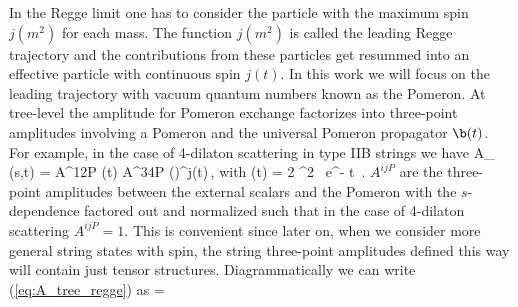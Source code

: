 In the Regge limit one has to consider the particle with the maximum spin $j(m^2)$ for each mass. The function $j(m^2)$ is called the leading Regge trajectory and the contributions from these particles get resummed into an effective particle with continuous spin $j(t)$.
In this work we will focus on the leading trajectory with   vacuum  quantum numbers known as the Pomeron.
At tree-level the amplitude for Pomeron exchange factorizes into three-point amplitudes involving a Pomeron and the universal Pomeron propagator $\b(t)$. For example,  in the case of 4-dilaton scattering in type IIB strings we have
\beq
A_ (s,t)  =    A^{12P} \beta(t) A^{34P} \left(\right)^{j(t)}\,,
\label{eq:A_tree_regge}
\eeq
with
\beq
\beta(t) =   2 \pi^2 \,
e^{-  t} \,.
\label{eq:pomeron_propagator}
\eeq
$A^{ijP}$ are the three-point amplitudes between the external scalars and the Pomeron with the
$s$-dependence factored out and normalized such that in the case of 4-dilaton scattering   $A^{ijP}=1$.
This is convenient since later on, when we consider more general string states with spin,
the string three-point amplitudes defined this way will contain just tensor structures.
Diagrammatically we can write (\ref{eq:A_tree_regge}) as
\beq
{}
=
\times
{}
